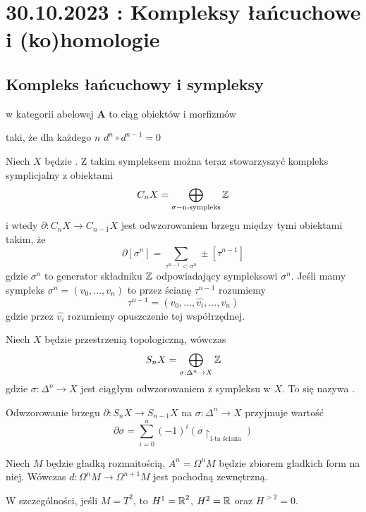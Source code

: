 \section{30.10.2023 : Kompleksy łańcuchowe i (ko)homologie}

\subsection{Kompleks łańcuchowy i sympleksy}

\begin{definition}
   w kategorii abelowej $\mathbf{A}$ to ciąg obiektów i morfizmów
  \begin{center}\end{center}
  taki, że dla każdego $n$ $d^n\circ d^{n-1}=0$
\end{definition}

\begin{example}
  \item Niech $X$ będzie . Z takim sympleksem można teraz stowarzyszyć kompleks symplicjalny z obiektami
    $$C_nX=\bigoplus_{\sigma-\text{n-sympleks}}\operatorname{\mathbb{Z}}$$
    i wtedy $\partial:C_nX\to C_{n-1}X$ jest odwzorowaniem brzegu między tymi obiektami takim, że
    $$\partial[\sigma^n]=\sum_{\tau^{n-1}<\sigma^n}\pm[\tau^{n-1}]$$
    gdzie $\sigma^n$ to generator składniku $\operatorname{\mathbb{Z}}$ odpowiadający sympleksowi $\sigma^n$. Jeśli mamy sympleks $\sigma^n=(v_0,...,v_n)$ to przez ścianę $\tau^{n-1}$ rozumiemy
    $$\tau^{n-1}=(v_0,...,\hat{v_i},...,v_n)$$
    gdzie przez $\hat{v_i}$ rozumiemy opuszczenie tej współrzędnej.

  \item Niech $X$ będzie przestrzenią topologiczną, wówczas 
    $$S_nX=\bigoplus_{\sigma:\Delta^n\to X}\operatorname{\mathbb{Z}}$$
    gdzie $\sigma:\Delta^n\to X$ jest ciągłym odwzorowaniem z sympleksu w $X$. To się nazywa .

    Odwzorowanie brzegu $\partial: S_nX\to S_{n-1}X$ na $\sigma:\Delta^n\to X$ przyjmuje wartość
    $$\partial\sigma=\sum_{i=0}^n(-1)^i(\sigma\restriction_\text{i-ta ściana})$$
    
  \item {}

    Niech $M$ będzie gładką rozmaitością, $A^n=\Omega^nM$ będzie zbiorem gładkich form na niej. Wówczas $d:\Omega^nM\to\Omega^{n+1}M$ jest pochodną zewnętrzną.

    W szczególności, jeśli $M=T^2$, to $H^1=\operatorname{\mathbb{R}}^2$, $H^2=\operatorname{\mathbb{R}}$ oraz $H^{>2}=0$.
\end{example}

